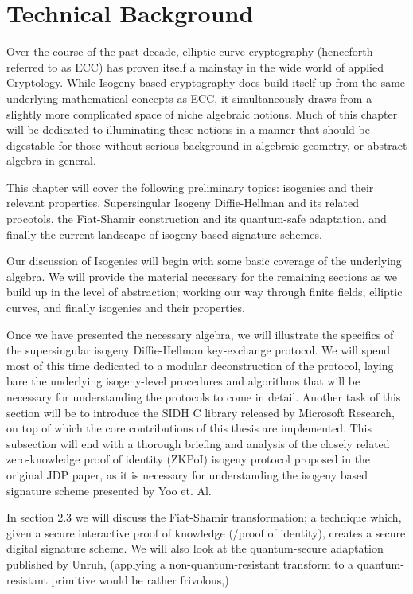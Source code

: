 \chapter{Technical Background}

Over the course of the past decade, elliptic curve cryptography (henceforth referred to as ECC) has proven itself a mainstay in the wide world of applied Cryptology. While Isogeny based cryptography does build itself up from the same underlying mathematical concepts as ECC, it simultaneously draws from a slightly more complicated space of niche algebraic notions. Much of this chapter will be dedicated to illuminating these notions in a manner that should be digestable for those without serious background in algebraic geometry, or abstract algebra in general.

This chapter will cover the following preliminary topics: isogenies and their relevant properties, Supersingular Isogeny Diffie-Hellman and its related procotols, the Fiat-Shamir construction and its quantum-safe adaptation, and finally the current landscape of isogeny based signature schemes.

Our discussion of Isogenies will begin with some basic coverage of the underlying algebra. We will provide the material necessary for the remaining sections as we build up in the level of abstraction; working our way through finite fields, elliptic curves, and finally isogenies and their properties.

Once we have presented the necessary algebra, we will illustrate the specifics of the supersingular isogeny Diffie-Hellman key-exchange protocol. We will spend most of this time dedicated to a modular deconstruction of the protocol, laying bare the underlying isogeny-level procedures and algorithms that will be necessary for understanding the protocols to come in detail. Another task of this section will be to introduce the SIDH C library released by Microsoft Research, on top of which the core contributions of this thesis are implemented. This subsection will end with a thorough briefing and analysis of the closely related zero-knowledge proof of identity (ZKPoI) isogeny protocol proposed in the original JDP paper, as it is necessary for understanding the isogeny based signature scheme presented by Yoo et. Al.

In section 2.3 we will discuss the Fiat-Shamir transformation; a technique which, given a secure interactive proof of knowledge (/proof of identity), creates a secure digital signature scheme. We will also look at the quantum-secure adaptation published by Unruh, (applying a non-quantum-resistant transform to a quantum-resistant primitive would be rather frivolous,) 

